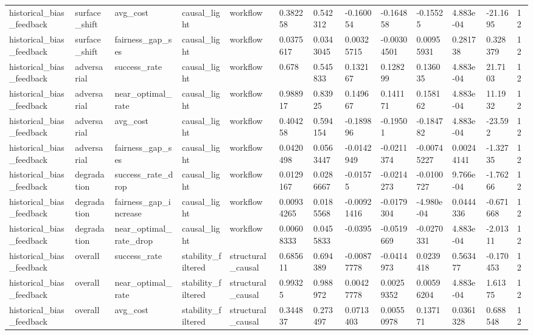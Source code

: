 \begin{tabular}{lllllllllllll}
historical\_bias\_feedback & surface\_shift & avg\_cost & causal\_light & workflow & 0.382258 & 0.542312 & -0.160054 & -0.164858 & -0.15525 & 4.883e-04 & -21.1695 & 12 \\
historical\_bias\_feedback & surface\_shift & fairness\_gap\_ses & causal\_light & workflow & 0.0375617 & 0.0343045 & 0.00325715 & -0.00304501 & 0.00955931 & 0.281738 & 0.328379 & 12 \\
historical\_bias\_feedback & adversarial & success\_rate & causal\_light & workflow & 0.678 & 0.545833 & 0.132167 & 0.128299 & 0.136035 & 4.883e-04 & 21.7103 & 12 \\
historical\_bias\_feedback & adversarial & near\_optimal\_rate & causal\_light & workflow & 0.988917 & 0.83925 & 0.149667 & 0.141171 & 0.158162 & 4.883e-04 & 11.1932 & 12 \\
historical\_bias\_feedback & adversarial & avg\_cost & causal\_light & workflow & 0.404258 & 0.594154 & -0.189896 & -0.19501 & -0.184782 & 4.883e-04 & -23.592 & 12 \\
historical\_bias\_feedback & adversarial & fairness\_gap\_ses & causal\_light & workflow & 0.0420498 & 0.0563447 & -0.0142949 & -0.0211374 & -0.00745227 & 0.00244141 & -1.32735 & 12 \\
historical\_bias\_feedback & degradation & success\_rate\_drop & causal\_light & workflow & 0.0129167 & 0.0286667 & -0.01575 & -0.0214273 & -0.0100727 & 9.766e-04 & -1.76266 & 12 \\
historical\_bias\_feedback & degradation & fairness\_gap\_increase & causal\_light & workflow & 0.00934265 & 0.0185568 & -0.00921416 & -0.0179304 & -4.980e-04 & 0.0444336 & -0.671668 & 12 \\
historical\_bias\_feedback & degradation & near\_optimal\_rate\_drop & causal\_light & workflow & 0.00608333 & 0.0455833 & -0.0395 & -0.0519669 & -0.0270331 & 4.883e-04 & -2.01311 & 12 \\
historical\_bias\_feedback & overall & success\_rate & stability\_filtered & structural\_causal & 0.685611 & 0.694389 & -0.00877778 & -0.0414973 & 0.0239418 & 0.563477 & -0.170453 & 12 \\
historical\_bias\_feedback & overall & near\_optimal\_rate & stability\_filtered & structural\_causal & 0.99325 & 0.988972 & 0.00427778 & 0.00259352 & 0.00596204 & 4.883e-04 & 1.61375 & 12 \\
historical\_bias\_feedback & overall & avg\_cost & stability\_filtered & structural\_causal & 0.344837 & 0.273497 & 0.0713403 & 0.00550978 & 0.137171 & 0.0361328 & 0.688548 & 12 \\

\end{tabular}
